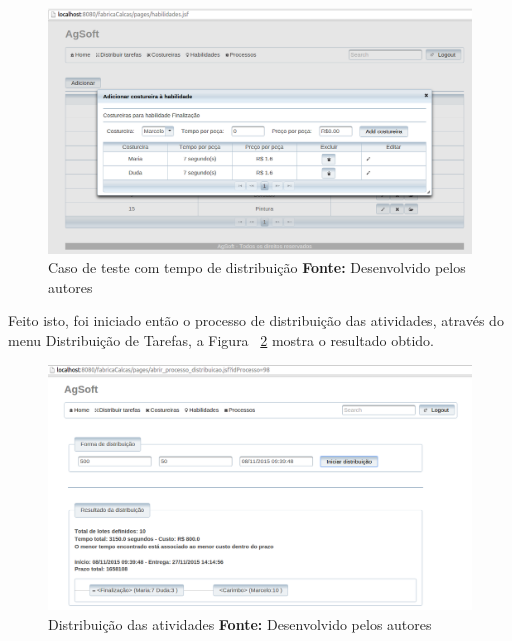\begin{figure}[h!]
	\centerline{\includegraphics[scale=0.3]{./imagens/cofig_at_finalizaca_teste4.png}}
	\caption[Caso de teste com tempo de distribuição]
	{Caso de teste com tempo de distribuição \textbf{Fonte:} Desenvolvido pelos autores}
	\label{fig:at_finalizacao_teste4}
\end{figure}

\newpage

\par Feito isto, foi iniciado então o processo de distribuição das atividades,
através do menu Distribuição de Tarefas, a Figura
~\ref{fig:resultado_transporte_teste4} mostra o resultado obtido.


\begin{figure}[h!]
	\centerline{\includegraphics[scale=0.3]{./imagens/resultado_transporte_teste4.png}}
	\caption[Distribuição das atividades]
	{Distribuição das atividades \textbf{Fonte:} Desenvolvido pelos autores}
	\label{fig:resultado_transporte_teste4}
\end{figure}

